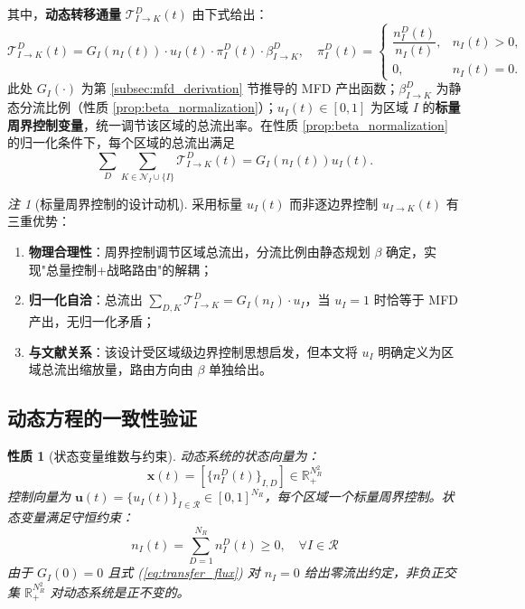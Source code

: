 \documentclass[a4paper,12pt]{article}
\theoremstyle{plain}
\newtheorem{property}[theorem]{性质}
\theoremstyle{definition}
\theoremstyle{remark}
\newtheorem{remark}[theorem]{注}
\begin{document}
其中，\textbf{动态转移通量} $\mathcal{T}_{I \to K}^D(t)$ 由下式给出：
\begin{equation}\label{eq:transfer_flux}
    \mathcal{T}_{I \to K}^D(t) = G_I(n_I(t)) \cdot u_I(t) \cdot \pi_I^D(t) \cdot \beta_{I \to K}^D,
    \quad
    \pi_I^D(t)=
    \begin{cases}
    \dfrac{n_I^D(t)}{n_I(t)}, & n_I(t)>0,\\[0.8em]
    0, & n_I(t)=0 .
    \end{cases}
\end{equation}
此处 $G_I(\cdot)$ 为第 \ref{subsec:mfd_derivation} 节推导的 MFD 产出函数；$\beta_{I \to K}^D$ 为静态分流比例（性质 \ref{prop:beta_normalization}）；$u_I(t) \in [0, 1]$ 为区域 $I$ 的\textbf{标量周界控制变量}，统一调节该区域的总流出率。在性质 \ref{prop:beta_normalization} 的归一化条件下，每个区域的总流出满足
\begin{equation}\label{eq:total_outflow_identity}
    \sum_D\sum_{K\in\mathcal N_I\cup\{I\}}\mathcal T_{I\to K}^D(t)=G_I(n_I(t))u_I(t).
\end{equation}

\begin{remark}[标量周界控制的设计动机]\label{rem:scalar_control}
采用标量 $u_I(t)$ 而非逐边界控制 $u_{I \to K}(t)$ 有三重优势：
\begin{enumerate}
    \item \textbf{物理合理性}：周界控制调节区域总流出，分流比例由静态规划 $\beta$ 确定，实现"总量控制+战略路由"的解耦；
    \item \textbf{归一化自洽}：总流出 $\sum_{D,K} \mathcal{T}_{I \to K}^D = G_I(n_I) \cdot u_I$，当 $u_I = 1$ 时恰等于 MFD 产出，无归一化矛盾；
    \item \textbf{与文献关系}：该设计受区域级边界控制思想启发，但本文将 $u_I$ 明确定义为区域总流出缩放量，路由方向由 $\beta$ 单独给出。
\end{enumerate}
\end{remark}

\subsection{动态方程的一致性验证}

\begin{property}[状态变量维数与约束]\label{prop:dynamic_consistency}
动态系统的状态向量为：
\begin{equation}
    \bm{x}(t) = \left[\{n_I^D(t)\}_{I,D}\right] \in \mathbb{R}_{+}^{N_R^2}
\end{equation}
控制向量为 $\bm{u}(t) = \{u_I(t)\}_{I \in \mathcal{R}} \in [0,1]^{N_R}$，每个区域一个标量周界控制。状态变量满足守恒约束：
\begin{equation}
    n_I(t) = \sum_{D=1}^{N_R} n_I^D(t) \ge 0, \quad \forall I \in \mathcal{R}
\end{equation}
由于 $G_I(0)=0$ 且式 (\ref{eq:transfer_flux}) 对 $n_I=0$ 给出零流出约定，非负正交集 $\mathbb R_+^{N_R^2}$ 对动态系统是正不变的。
\end{property}
\end{document}
